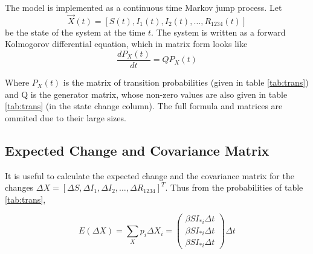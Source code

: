 \documentclass[12pt]{article}
\begin{document}
The model is implemented as a continuous time Markov jump process. Let
$$\overrightarrow{X}(t) = [S(t), I_1(t), I_2(t), \ldots, R_{1234}(t)]$$ 
be the 
state of the system at the time $t$. 
The system is written as a forward Kolmogorov differential equation, which in 
matrix form looks like
\begin{equation}
\frac{dP_X(t)}{dt} = Q P_X(t) 
\end{equation}

Where $P_X(t)$ is  the matrix of transition probabilities (given in table 
\ref{tab:trans}) and Q is the generator matrix, whose non-zero values are also 
given in table \ref{tab:trans} (in the state change column). The full formula 
and matrices are ommited due to their large sizes.

\subsection*{Expected Change and Covariance Matrix}

It is useful to calculate the expected change and the covariance matrix for the 
changes $\Delta X = [\Delta S, \Delta I_1, \Delta I_2, \ldots, 
\Delta R_{1234}]^T$. Thus from the probabilities of table \ref{tab:trans},

\begin{equation}
 E(\Delta X)=\sum_X p_i \Delta X_i=
\begin{pmatrix}
\beta S I_{*i} \Delta t\\
\beta S I_{*i} \Delta t\\
\beta S I_{*i} \Delta t
 \end{pmatrix}
 \Delta t
\end{equation}



\end{document}
